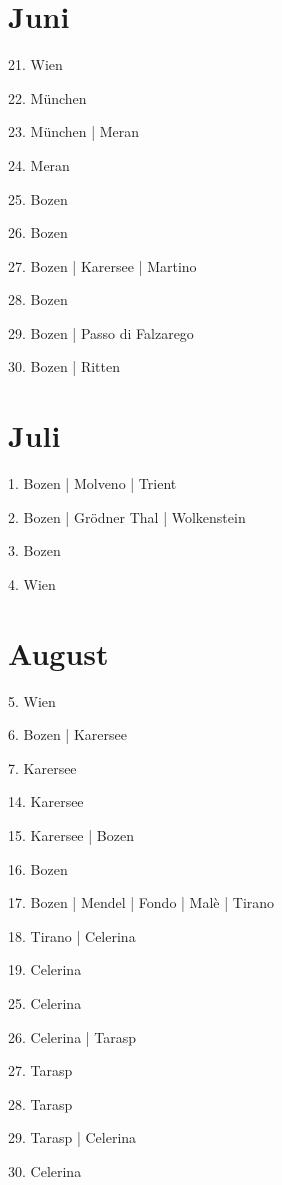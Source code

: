 \documentclass[twoside=false,titlepage=false,open=any, parskip=never, fontsize=10pt, headings=small, chapterprefix=false, appendixprefix=false, DIV=15]{scrbook}
\begin{document}
\begin{multicols}{3}
            \section*{Juni}
            21. Wien\par
            22. München\par
            23. München | Meran\par
            24. Meran\par
            25. Bozen\par
            26. Bozen\par
            27. Bozen | Karersee | Martino\par
            28. Bozen\par
            29. Bozen | Passo di Falzarego\par
            30. Bozen | Ritten\par
            \section*{Juli}
            1. Bozen | Molveno | Trient\par
            2. Bozen | Grödner Thal | Wolkenstein\par
            3. Bozen\par
            4. Wien\par
            \section*{August}
            5. Wien\par
            6. Bozen | Karersee\par
            7. Karersee\par
            14. Karersee\par
            15. Karersee | Bozen\par
            16. Bozen\par
            17. Bozen | Mendel | Fondo | Malè | Tirano\par
            18. Tirano | Celerina\par
            19. Celerina\par
            25. Celerina\par
            26. Celerina | Tarasp\par
            27. Tarasp\par
            28. Tarasp\par
            29. Tarasp | Celerina\par
            30. Celerina\par

\end{multicols}
\end{document}
